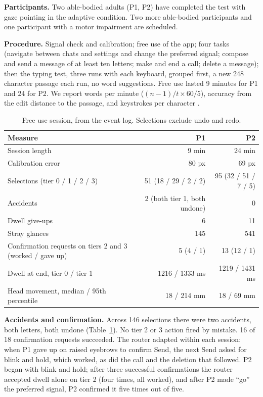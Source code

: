 \documentclass[manuscript,review]{acmart}
\begin{document}
\textbf{Participants.} Two able-bodied adults (P1, P2) have completed the test with gaze pointing
in the adaptive condition. Two more able-bodied participants and one participant with a motor
impairment are scheduled.

\textbf{Procedure.} Signal check and calibration; free use of the app; four tasks (navigate between
chats and settings and change the preferred signal; compose and send a message of at least ten
letters; make and end a call; delete a message); then the typing test, three runs with each
keyboard, grouped first, a new 248 character passage each run, no word suggestions. Free use
lasted 9 minutes for P1 and 24 for P2. We report words per minute ($(n-1)/t \times 60/5$),
accuracy from the edit distance to the passage, and keystrokes per character \cite{soukoreff2003}.

\begin{table}[t]
  \caption{Free use session, from the event log. Selections exclude undo and redo.}
  \label{tab:session}
  \small
  \begin{tabular}{lrr}
    \toprule
    Measure & P1 & P2 \\
    \midrule
    Session length & 9 min & 24 min \\
    Calibration error & 80 px & 69 px \\
    Selections (tier 0 / 1 / 2 / 3) & 51 (18 / 29 / 2 / 2) & 95 (32 / 51 / 7 / 5) \\
    Accidents & 2 (both tier 1, both undone) & 0 \\
    Dwell give-ups & 6 & 11 \\
    Stray glances & 145 & 541 \\
    Confirmation requests on tiers 2 and 3 (worked / gave up) & 5 (4 / 1) & 13 (12 / 1) \\
    Dwell at end, tier 0 / tier 1 & 1216 / 1333 ms & 1219 / 1431 ms \\
    Head movement, median / 95th percentile & 18 / 214 mm & 18 / 69 mm \\
    \bottomrule
  \end{tabular}
\end{table}

\textbf{Accidents and confirmation.} Across 146 selections there were two accidents, both letters,
both undone (Table~\ref{tab:session}). No tier 2 or 3 action fired by mistake. 16 of 18
confirmation requests succeeded. The router adapted within each session: when P1 gave up on raised
eyebrows to confirm Send, the next Send asked for blink and hold, which worked, as did the call and
the deletion that followed. P2 began with blink and hold; after three successful confirmations the
router accepted dwell alone on tier 2 (four times, all worked), and after P2 made ``go'' the
preferred signal, P2 confirmed it five times out of five.
\end{document}
